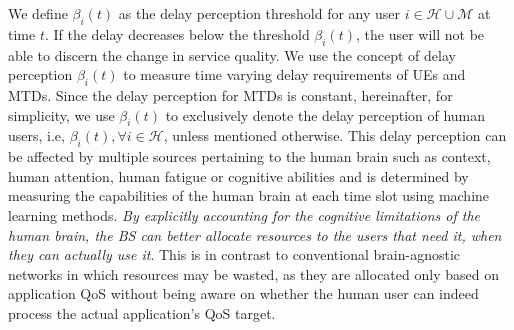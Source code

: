\documentclass[journal,draftclsnofoot,onecolumn,12pt]{IEEEtran}%
\begin{document}
 We define $\beta_i(t)$ as the delay perception threshold for any user $i \in \mathcal{H}\cup \mathcal{M}$ at time $t$. If the delay decreases below the threshold $\beta_i(t)$, the user will not be able to discern the change in service quality.
We use the concept of delay perception $\beta_i(t)$ to measure time varying delay requirements of UEs and MTDs. Since the delay perception for MTDs is constant, hereinafter, for simplicity, we use $\beta_i(t)$ to exclusively denote the delay perception of human users, i.e, $\beta_i(t), \forall i \in \mathcal{H}$, unless mentioned otherwise.
 This delay perception can be affected by multiple sources pertaining to the human brain such as context, human attention, human fatigue or cognitive abilities and is determined by measuring the capabilities of the human brain at each time slot using machine learning methods.
	\emph{By explicitly accounting for the cognitive limitations of the human brain, the BS can better allocate resources to the users that need it, when they can actually use it}. This is in contrast to conventional brain-agnostic networks \cite{semiari2015context,huang2016system} in which resources may be wasted, as they are allocated only based on application QoS without being aware on whether the human user can indeed process the actual application's QoS target.
	
	
	
\end{document}
